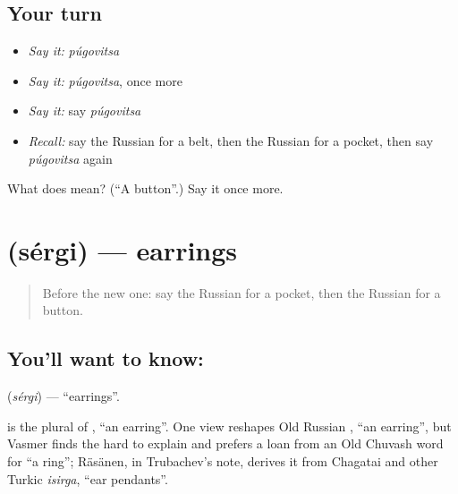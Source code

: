 \subsection*{Your turn}
\begin{itemize}
\raggedright
  \item \emph{Say it:} \emph{púgovitsa}
  \item \emph{Say it:} \emph{púgovitsa}, once more
  \item \emph{Say it:} say \emph{púgovitsa}
  \item \emph{Recall:} say the Russian for a belt, then the Russian for a pocket, then say \emph{púgovitsa} again
\end{itemize}

\begin{tcolorbox}[breakable,colback=teal!4,colframe=teal!35!black,title={Before you move on}]
What does  mean? (\textquotedblleft{}A button\textquotedblright{}.) Say it once more.
\end{tcolorbox}
\section[\texorpdfstring{\ru{серьги} (sérgi)}{серьги (sérgi)}]{ (sérgi) — earrings}

\label{lesson:RU-C193-sergi}



\begin{quote}
Before the new one: say the Russian for a pocket, then the Russian for a button.
\end{quote}

\subsection*{You'll want to know: }
\textbf{} (\emph{sérgi}) — \textquotedblleft{}earrings\textquotedblright{}.

\begin{cousinweb}
\textbf{} is the plural of \emph{}, \textquotedblleft{}an earring\textquotedblright{}. One view reshapes Old Russian \emph{}, \textquotedblleft{}an earring\textquotedblright{}, but Vasmer finds the \emph{} hard to explain and prefers a loan from an Old Chuvash word for \textquotedblleft{}a ring\textquotedblright{}; Räsänen, in Trubachev's note, derives it from Chagatai and other Turkic \emph{isirga}, \textquotedblleft{}ear pendants\textquotedblright{}.
\end{cousinweb}

